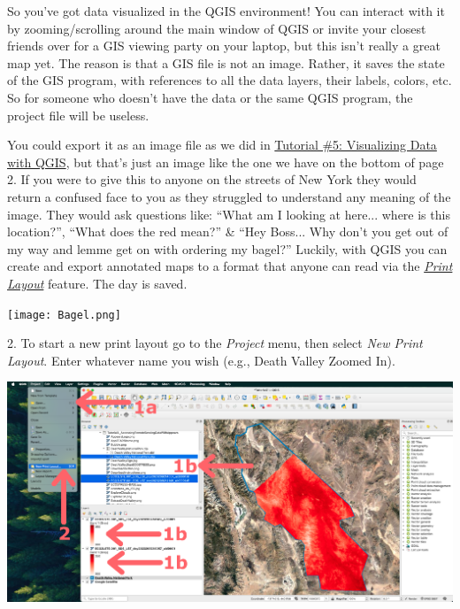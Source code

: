 \documentclass[oneside,a4paper,11pt,explicit]{book}
\begin{document}
\begin{tcolorbox}[colback=yellow!5!white,colframe=IceCreamLeaf,title=\textbf{The \textit{Print Layout} Feature in QGIS}]
So you've got data visualized in the QGIS environment! You can interact with it by zooming/scrolling around the main window of QGIS or invite your closest friends over for a GIS viewing party on your laptop, but this isn't really a great map yet. The reason is that a GIS file is not an image. Rather, it saves the state of the GIS program, with references to all the data layers, their labels, colors, etc. So for someone who doesn’t have the data or the same QGIS program, the project file will be useless. 

\vspace{.5em}

You could export it as an image file as we did in \href{https://jeremydforsythe.github.io/icecream-tutorials/Tutorial5_VisualizingDataWithQGIS/Tutorial5_VisualizingDataWithQGIS.pdf}{Tutorial \#5: Visualizing Data with QGIS}, but that's just an image like the one we have on the bottom of page 2. If you were to give this to anyone on the streets of New York they would return a confused face to you as they struggled to understand any meaning of the image. They would ask questions like: ``What am I looking at here... where is this location?'', ``What does the red mean?'' \& ``Hey Boss... Why don't you get out of my way and lemme get on with ordering my bagel?'' Luckily, with QGIS you can create and export annotated maps to a format that anyone can read via the \href{https://docs.qgis.org/3.34/en/docs/training_manual/map_composer/map_composer.html}{\textit{Print Layout}} feature. The day is saved.

\centerline{\texttt{[image: Bagel.png]}}

\vspace{-1em}

\end{tcolorbox}

\vspace{.5em}

2. To start a new print layout go to the \textit{Project} menu, then select \textit{New Print Layout}. Enter whatever name you wish (e.g., Death Valley Zoomed In).

\vspace{.5em}

\centerline{\includegraphics[width=\textwidth]{StartPrintLayout.png}}
\end{document}
